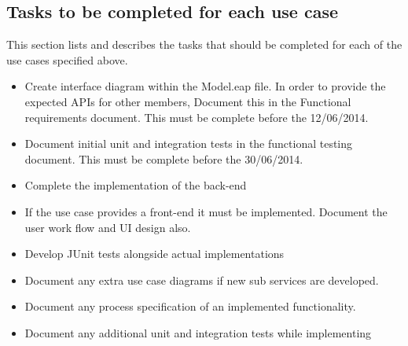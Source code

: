 \documentclass[12pt]{article}
\begin{document}
\subsection{Tasks to be completed for each use case}
This section lists and describes the tasks that should be completed for each of the use cases specified above.
\begin{itemize}
	\item Create interface diagram within the Model.eap file. In order to provide the expected APIs for other members, Document this in the Functional requirements document. This must be complete before the 12/06/2014.
	\item Document initial unit and integration tests in the functional testing document. This must be complete before the 30/06/2014.
	\item Complete the implementation of the back-end
	\item If the use case provides a front-end it must be implemented. Document the user work flow and UI design also.
	\item Develop JUnit tests alongside actual implementations 
	\item Document any extra use case diagrams if new sub services are developed.
	\item Document any process specification of an implemented functionality. 
	\item Document any additional unit and integration tests while implementing
\end{itemize}
\end{document}
